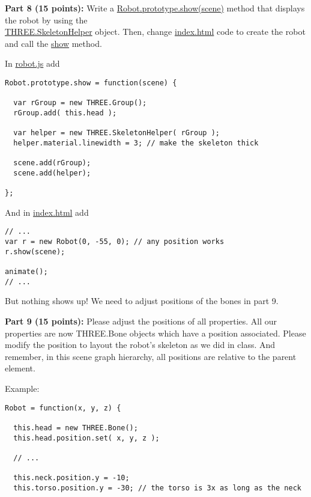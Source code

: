 \documentclass[10pt,oneside,onecolumn,letterpaper]{article}
\begin{document}
\vspace{.5cm}

\noindent\textbf{Part 8 (15 points):} Write a \url{Robot.prototype.show(scene)} method that displays the robot by using the\\ \url{THREE.SkeletonHelper} object. Then, change  \url{index.html} code to create the robot and call the \url{show} method.

\vspace{.5cm}

\noindent In \url{robot.js} add

\begin{verbatim}
Robot.prototype.show = function(scene) {

  var rGroup = new THREE.Group();
  rGroup.add( this.head );

  var helper = new THREE.SkeletonHelper( rGroup );
  helper.material.linewidth = 3; // make the skeleton thick

  scene.add(rGroup);
  scene.add(helper);

};
\end{verbatim}

\noindent And in \url{index.html} add

\begin{verbatim}
// ...
var r = new Robot(0, -55, 0); // any position works
r.show(scene);

animate();
// ...
\end{verbatim}

\noindent But nothing shows up! We need to adjust positions of the bones in part 9.

\vspace{.5cm}

\noindent\textbf{Part 9 (15 points):} Please adjust the positions of all properties. All our properties are now THREE.Bone objects which have a position associated. Please modify the position to layout the robot's skeleton as we did in class. And remember, in this scene graph hierarchy, all positions are relative to the parent element.

\vspace{.5cm}

\noindent Example:

\begin{verbatim}
Robot = function(x, y, z) {

  this.head = new THREE.Bone();
  this.head.position.set( x, y, z );

  // ...

  this.neck.position.y = -10;
  this.torso.position.y = -30; // the torso is 3x as long as the neck
\end{verbatim}
\end{document}
